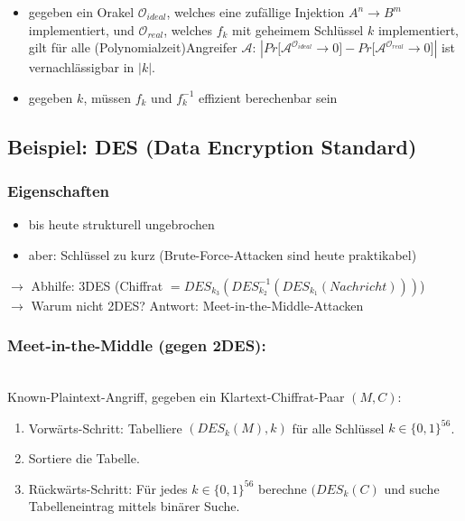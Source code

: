 \documentclass[a4paper,twoside,DIV15,BCOR12mm]{scrbook}
\begin{document}
\begin{itemize}
	\item gegeben ein Orakel $\mathcal{O}_{ideal}$, welches eine zufällige Injektion $A^n \rightarrow B^m$ implementiert, und $\mathcal{O}_{real}$, welches $f_k$ mit geheimem Schlüssel $k$ implementiert, gilt für alle (Polynomialzeit)Angreifer $\mathcal{A}$: $\left| Pr\lbrack \mathcal{A}^{\mathcal{O}_{ideal}} \rightarrow 0 \rbrack - Pr\lbrack \mathcal{A}^{\mathcal{O}_{real}} \rightarrow 0 \rbrack \right|$ ist vernachlässigbar in $\left| k \right|$.
	\item gegeben $k$, müssen $f_k$ und $f_k^{-1}$ effizient berechenbar sein
\end{itemize}

\subsection{Beispiel: DES (Data Encryption Standard)}


\subsubsection{Eigenschaften}

\begin{itemize}
	\item bis heute strukturell ungebrochen
	\item aber: Schlüssel zu kurz (Brute-Force-Attacken sind heute praktikabel)
\end{itemize}

$\rightarrow$ Abhilfe: 3DES (Chiffrat $= {DES}_{k_3}({DES}^{-1}_{k_2}({DES}_{k_1}(Nachricht)))$)\\
$\rightarrow$ Warum nicht 2DES? Antwort: Meet-in-the-Middle-Attacken

\subsubsection{Meet-in-the-Middle (gegen 2DES):}

\\

Known-Plaintext-Angriff, gegeben ein Klartext-Chiffrat-Paar $(M, C)$:

\begin{enumerate}
	\item Vorwärts-Schritt: Tabelliere $({DES}_k(M), k)$ für alle Schlüssel $k \in { \{ 0, 1\} }^{56}$.
	\item Sortiere die Tabelle.
	\item Rückwärts-Schritt: Für jedes $k \in { \{ 0, 1\} }^{56}$ berechne $({DES}_k(C)$ und suche Tabelleneintrag mittels binärer Suche.
\end{enumerate}
\end{document}
